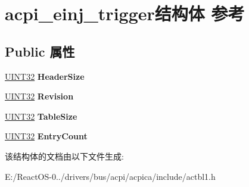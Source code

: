 \hypertarget{structacpi__einj__trigger}{}\section{acpi\+\_\+einj\+\_\+trigger结构体 参考}
\label{structacpi__einj__trigger}
\subsection*{Public 属性}
\begin{DoxyCompactItemize}
\item 
\mbox{\label{structacpi__einj__trigger_a802536a437b1cb14639237828b1c38d5}} 
\hyperlink{_processor_bind_8h_ae1e6edbbc26d6fbc71a90190d0266018}{U\+I\+N\+T32} {\bfseries Header\+Size}
\item 
\mbox{\label{structacpi__einj__trigger_a0e0973d25b61a42003c582d8cc609e27}} 
\hyperlink{_processor_bind_8h_ae1e6edbbc26d6fbc71a90190d0266018}{U\+I\+N\+T32} {\bfseries Revision}
\item 
\mbox{\label{structacpi__einj__trigger_afe2d8ae3758e265238c4fee186253cfb}} 
\hyperlink{_processor_bind_8h_ae1e6edbbc26d6fbc71a90190d0266018}{U\+I\+N\+T32} {\bfseries Table\+Size}
\item 
\mbox{\label{structacpi__einj__trigger_a185e81d7586b40fdb306093d2665fd2e}} 
\hyperlink{_processor_bind_8h_ae1e6edbbc26d6fbc71a90190d0266018}{U\+I\+N\+T32} {\bfseries Entry\+Count}
\end{DoxyCompactItemize}


该结构体的文档由以下文件生成\+:\begin{DoxyCompactItemize}
\item 
E\+:/\+React\+O\+S-\/0../drivers/bus/acpi/acpica/include/actbl1.\+h\end{DoxyCompactItemize}

